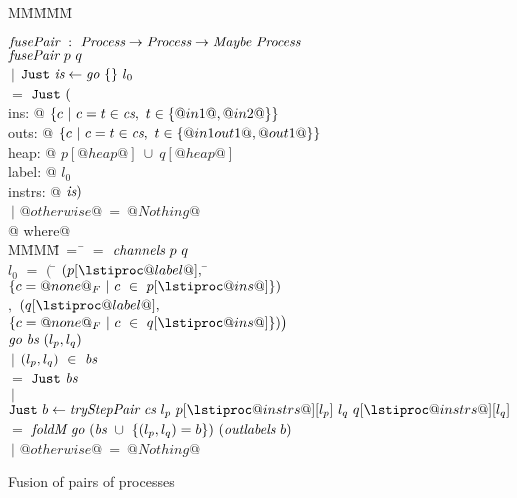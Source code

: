
\begin{figure}

\begin{tabbing}
M\=M\=M\=M\=M\kill

$\textit{fusePair} ~:~ \textit{Process} \to \textit{Process} \to  \textit{Maybe}~\textit{Process}$ \\
$\textit{fusePair}~p~q$ \\
\> $~|$ \> $\texttt{Just}~ \textit{is} \gets \textit{go}~\{  \}~l_0$ \\
\> $=$ \> $\texttt{Just}~ ($\lstiproc@process@ \\
\lstiproc@             ins: @ $\{ c~|~c=t \in \textit{cs},~t \in \{ @in1@,@in2@ \} \} $ \\
\lstiproc@            outs: @ $\{ c~|~c=t \in \textit{cs},~t \in \{ @in1out1@,@out1@ \} \} $ \\
\lstiproc@            heap: @ $p[@heap@]~\cup~q[@heap@]$ \\
\lstiproc@           label: @ $l_0$ \\
\lstiproc@          instrs: @ $\textit{is})$ \\
\> $~|$ \> $@otherwise@~=~@Nothing@$ \\
@ where@ \\
M\=MM\=M\=~=~\=\kill
 \> \cs \> $=$ \> $\textit{channels}~p~q$ \\[0.5ex]

 \> $l_0$  \> $=$ \> $
      \big($ \= $(p[\lstiproc@label@],$ \= $\sgl{c=@none@_F~|~c~\in~p[\lstiproc@ins@]})$
\\ \> \> \>$,$ \> $(q[\lstiproc@label@],$ \> $\sgl{c=@none@_F~|~c~\in~q[\lstiproc@ins@]})
      \big)$ \\[0.5ex]

 \> $\textit{go}~\textit{bs}~(l_p,l_q)$ \\
 \> \> $~|$ \> $(l_p,l_q)~\in~\textit{bs}$ \\
 \> \> $=$ \> $\texttt{Just}~\textit{bs}$ \\[0.5ex]
 \> \> $~|$ \> $\Just b \gets \ti{tryStepPair}~\cs~l_p~p[\lstiproc@instrs@][l_p]~l_q~q[\lstiproc@instrs@][l_q]$ \\ 
 \> \> $=$ \> $\textit{foldM}~\textit{go}~(\textit{bs}~\cup~\{ (l_p,l_q)=b \})~(\textit{outlabels}~b)$ \\[0.5ex]
 \> \> $~|$ \> $@otherwise@~=~@Nothing@$
\end{tabbing}

\caption{Fusion of pairs of processes}


\label{fig:Fusion:Def:Top}
\end{figure}
